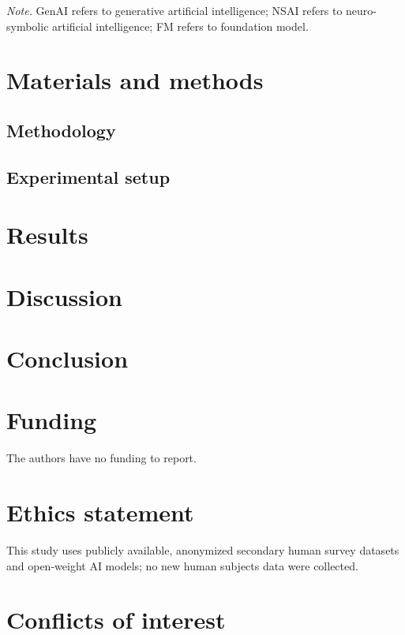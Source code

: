 \documentclass[
  11pt,
  letterpaper,
]{article}
\begin{document}
\emph{Note.} GenAI refers to generative artificial intelligence; NSAI
refers to neuro-symbolic artificial intelligence; FM refers to
foundation model.

\section{Materials and methods}\label{sec-methods}

\subsection{Methodology}\label{sec-methodology}

\subsection{Experimental setup}\label{sec-setup}

\section{Results}\label{sec-results}

\section{Discussion}\label{sec-discussion}

\section{Conclusion}\label{sec-conclusion}

\section*{Funding}\label{funding}

The authors have no funding to report.

\section*{Ethics statement}\label{ethics-statement}

This study uses publicly available, anonymized secondary human survey
datasets and open-weight AI models; no new human subjects data were
collected.

\section*{Conflicts of interest}\label{conflicts-of-interest}
\end{document}
